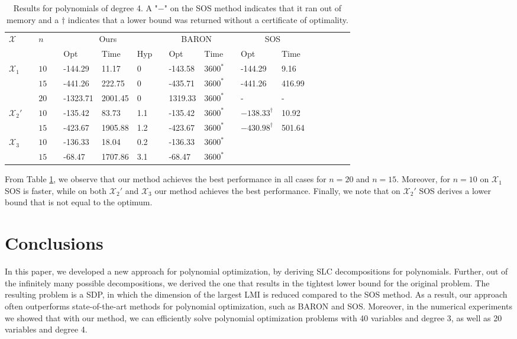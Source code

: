 \documentclass[opre,nonblindrev]{informs3} %
\begin{document}
\begin{table}[H]   
    \centering 
    \begin{tabular}{lcllllllllllllllll}
    \hline 
    \multirow{2}{*}{$\mathcal{X}$} & & \multirow{2}{*}{$n$} & &  \multicolumn{3}{c}{Ours} &  & \multicolumn{2}{c}{BARON} & & \multicolumn{2}{c}{SOS} \\
		\cline{5-7} \cline{9-10} \cline{12-13} 
    	& & &  & Opt  & Time & Hyp &  & Opt & Time & & Opt & Time \\ \hline \hline 
        \multirow{3}{*}{$\mathcal{X}_1$} & & $10$ & & -144.29 & 11.17 & 0 & & -143.58 & $3600^{*}$ & & -144.29 & 9.16 \\
        & & $15$ & & -441.26 & 222.75 & 0 & & -435.71 & $3600^{*}$ & & -441.26 & 416.99 \\
        & & $20$ & & -1323.71 & 2001.45 & 0 & & 1319.33 & $3600^{*}$ & & - & - \\ 
	\hline 
        \multirow{2}{*}{$\mathcal{X}_2'$} & & $10$ & & -135.42 & 83.73 & 1.1 & & -135.42 & $3600^{*}$ & & $-138.33^{\dag}$ & 10.92 \\
        & & $15$ & & -423.67 & 1905.88 & 1.2 & & -423.67 & $3600^{*}$ & & $-430.98^{\dag}$ & 501.64 \\
        \hline 
        \multirow{2}{*}{$\mathcal{X}_3$} & & $10$ & & -136.33 & 18.04 & 0.2 & & -136.33 & $3600^{*}$  & &  &  \\
        & & $15$ & & -68.47 & 1707.86 & 3.1 & & -68.47 & $3600^{*}$ & &  &  \\
        \hline 
    \end{tabular} 
    \caption{Results for polynomials of degree 4. A "$-$" on the SOS method indicates that it ran out of memory and a $\dag$ indicates that a lower bound was returned without a certificate of optimality. \label{tab:results_degree4}}
\end{table}   

From Table \ref{tab:results_degree4}, we observe that our method achieves the best performance in all cases for $n=20$ and $n=15$. Moreover, for $n=10$ on $\mathcal{X}_1$ SOS is faster, while on both $\mathcal{X}_2'$ and $\mathcal{X}_3$ our method achieves the best performance. Finally, we note that on $\mathcal{X}_2'$ SOS derives a lower bound that is not equal to the optimum.

\section{Conclusions}  
In this paper, we developed a new approach for polynomial optimization, by deriving SLC decompositions for polynomials. Further, out of the infinitely many possible decompositions, we derived the one that results in the tightest lower bound for the original problem. The resulting problem is a SDP, in which the dimension of the largest LMI is reduced compared to the SOS method. As a result, our approach often outperforms state-of-the-art methods for polynomial optimization, such as BARON and SOS. Moreover, in the numerical experiments we showed that with our method, we can efficiently solve polynomial optimization problems with 40 variables and degree 3, as well as 20 variables and degree 4.
 
\end{document}
